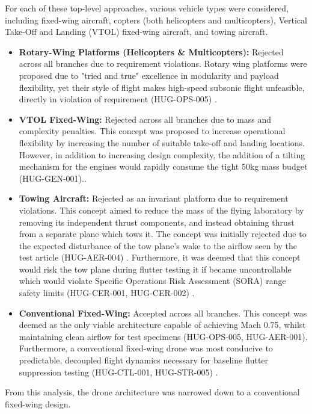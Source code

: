 For each of these top-level approaches, various vehicle types were considered, including fixed-wing aircraft, copters (both helicopters and multicopters), Vertical Take-Off and Landing (VTOL) fixed-wing aircraft, and towing aircraft.
\begin{itemize}
    \item \textbf{Rotary-Wing Platforms (Helicopters \& Multicopters):} Rejected across all branches due to requirement violations. Rotary wing platforms were proposed due to "tried and true" excellence in modularity and payload flexibility, yet their style of flight makes high-speed subsonic flight unfeasible, directly in violation of requirement (HUG-OPS-005) \cite{He2026}.
    \item \textbf{VTOL Fixed-Wing:} Rejected across all branches due to mass and complexity penalties. This concept was proposed to increase operational flexibility by increasing the number of suitable take-off and landing locations. However, in addition to increasing design complexity, the addition of a tilting mechanism for the engines would rapidly consume the tight 50kg mass budget (HUG-GEN-001).\cite{raymer1992aircraft}.
    \item \textbf{Towing Aircraft:} Rejected as an invariant platform due to requirement violations. This concept aimed to reduce the mass of the flying laboratory by removing its independent thrust components, and instead obtaining thrust from a separate plane which tows it. The concept was initially rejected due to the expected disturbance of the tow plane's wake to the airflow seen by the test article (HUG-AER-004) \cite{Vos}. Furthermore, it was deemed that this concept would risk the tow plane during flutter testing it if became uncontrollable which would violate Specific Operations Risk Assessment (SORA) range safety limits (HUG-CER-001, HUG-CER-002) \cite{livne}.
    \item \textbf{Conventional Fixed-Wing:} Accepted across all branches. This concept was deemed as the only viable architecture capable of achieving Mach 0.75, whilst maintaining clean airflow for test specimens (HUG-OPS-005, HUG-AER-001). Furthermore, a conventional fixed-wing drone was most conducive to predictable, decoupled flight dynamics necessary for baseline flutter suppression testing (HUG-CTL-001, HUG-STR-005) \cite{raymer1992aircraft, Vos, Abramov2014}.
\end{itemize}

From this analysis, the drone architecture was narrowed down to a conventional fixed-wing design. 


